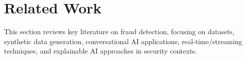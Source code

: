 \documentclass{article}
\begin{document}








\section{Related Work}
\label{sec:related}
This section reviews key literature on fraud detection, focusing on datasets, synthetic data generation, conversational AI applications, real-time/streaming techniques, and explainable AI approaches in security contexts.
\end{document}
